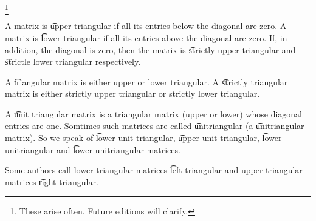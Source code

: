 
\footnote{These arise often. Future editions will clarify.}


A matrix is \t{upper triangular} if all its entries below the diagonal are zero.
A matrix is \t{lower triangular} if all its entries above the diagonal are zero.
If, in addition, the diagonal is zero, then the matrix is \t{strictly upper triangular} and \t{strictle lower triangular} respectively.

A \t{triangular} matrix is either upper or lower triangular.
A \t{strictly triangular} matrix is either strictly upper triangular or strictly lower triangular.

A \t{unit triangular matrix} is a triangular matrix (upper or lower) whose diagonal entries are one.
Somtimes such matrices are called \t{unitriangular} (a \t{unitriangular matrix}).
So we speak of \t{lower unit triangular}, \t{upper unit triangular}, \t{lower unitriangular} and \t{lower unitriangular} matrices.


Some authors call lower triangular matrices \t{left triangular} and upper triangular matrices \t{right triangular}.

\blankpage
